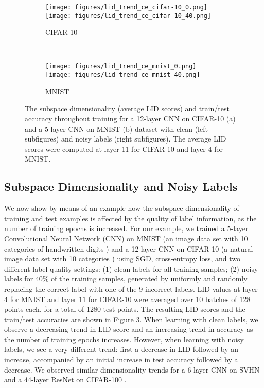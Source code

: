 \documentclass{article}
\begin{document}
\begin{figure}[!t]
\centering
\begin{subfigure}{.5\textwidth}
  \centering
  \texttt{[image: figures/lid\_trend\_ce\_cifar-10\_0.png]}
\texttt{[image: figures/lid\_trend\_ce\_cifar-10\_40.png]}
  \caption{CIFAR-10}
  \label{fig:lid_cifar}
\end{subfigure} \\
\begin{subfigure}{.5\textwidth}
  \centering
  \texttt{[image: figures/lid\_trend\_ce\_mnist\_0.png]}
\texttt{[image: figures/lid\_trend\_ce\_mnist\_40.png]}
  \caption{MNIST}
  \label{fig:lid_mnist}
\end{subfigure}
\caption{The subspace dimensionality (average LID scores) and train/test accuracy throughout training for a 12-layer CNN on CIFAR-10 (a) and a 5-layer CNN on MNIST (b) dataset with clean (left subfigures) and noisy labels (right subfigures). The average LID scores were computed at layer 11 for CIFAR-10 and layer 4 for MNIST.}
\label{fig:lid_trends}
\vspace{-0.2in}
\end{figure}

\subsection{Subspace Dimensionality and Noisy Labels}\label{sec:subsapce_dimensionality}
We now show by means of an example how the subspace dimensionality of training and test examples is affected by the quality of label information, as the number of training epochs is increased.
For our example, we trained a 5-layer Convolutional Neural Network (CNN) on MNIST (an image data set with 10 categories of handwritten digits \cite{lecun1998gradient}) and a 12-layer CNN on CIFAR-10 (a natural image data set with 10 categories \cite{krizhevsky2009learning}) using SGD, cross-entropy loss, and two different label quality settings: (1) clean labels for all training samples; (2) noisy labels for 40\% of the training samples, generated by uniformly and randomly replacing the correct label with one of the 9 incorrect labels. LID values at layer $4$ for MNIST and layer $11$ for CIFAR-10 were averaged over 10 batches of 128 points each, for a total of 1280 test points. The resulting LID scores and the train/test accuracies are shown in Figure \ref{fig:lid_trends}. When learning with clean labels, we observe a decreasing trend in LID score and an increasing trend in accuracy as the number of training epochs increases. However, when learning with noisy labels, we see a very different trend: first a decrease in LID followed by an increase, accompanied by an initial increase in test accuracy followed by a decrease. We observed similar dimensionality trends for a 6-layer CNN on SVHN \cite{netzer2011reading} and a 44-layer ResNet \cite{he2016deep} on CIFAR-100 \cite{krizhevsky2009learning}.
\end{document}
